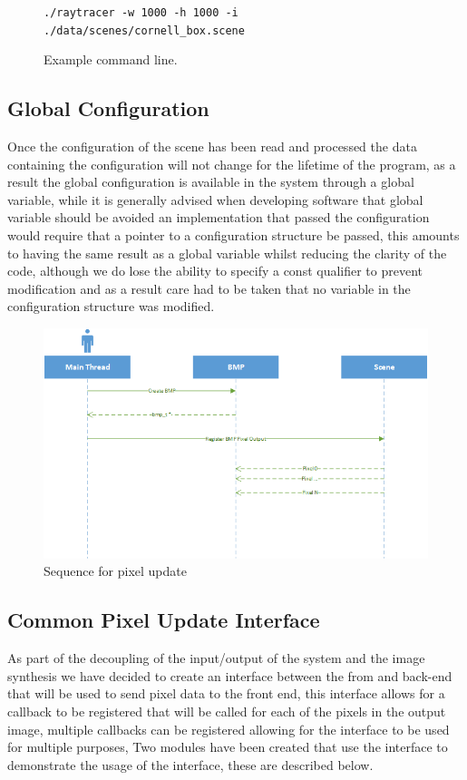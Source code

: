\begin{figure}[h]
\texttt{./raytracer -w 1000 -h 1000 -i ./data/scenes/cornell\_box.scene}
\caption{Example command line.}
\end{figure}

\subsection{Global Configuration}
Once the configuration of the scene has been read and processed the data containing the configuration will not change for
the lifetime of the program, as a result the global configuration is available in the system through a global variable, while
it is generally advised when developing software that global variable should be avoided an implementation that passed the
configuration would require that a pointer to a configuration structure be passed, this amounts to having the same result
as a global variable whilst reducing the clarity of the code, although we do lose the ability to specify a const qualifier
to prevent modification and as a result care had to be taken that no variable in the configuration structure was modified.

\begin{figure}
\centering
\includegraphics[width=\textwidth]{./images/pixel_update_sequence.png}
\caption{Sequence for pixel update}
\end{figure}

\subsection{Common Pixel Update Interface}
As part of the decoupling of the input/output of the system and the image synthesis we have decided to create an interface
between the from and back-end that will be used to send pixel data to the front end, this interface allows for a callback to
be registered that will be called for each of the pixels in the output image, multiple callbacks can be registered allowing
for the interface to be used for multiple purposes, Two modules have been created that use the interface to demonstrate the
usage of the interface, these are described below.

